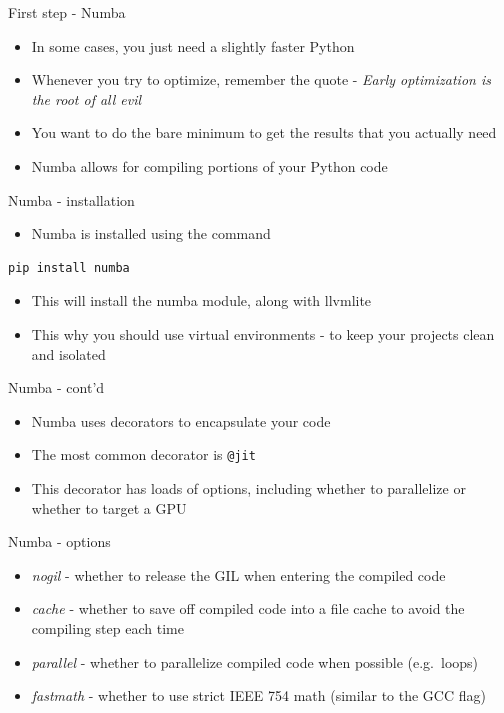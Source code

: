 \documentclass[presentation]{beamer}
\begin{document}
\begin{frame}[label=first-step---numba]{First step - Numba}
\begin{itemize}
\item In some cases, you just need a slightly faster Python
\item Whenever you try to optimize, remember the quote - \alert{\emph{Early
optimization is the root of all evil}}
\item You want to do the bare minimum to get the results that you actually
need
\item Numba allows for compiling portions of your Python code
\end{itemize}
\end{frame}
\begin{frame}[label=numba---installation,fragile]{Numba - installation}
 \begin{itemize}
\item Numba is installed using the command
\end{itemize}

\begin{verbatim}
pip install numba
\end{verbatim}

\begin{itemize}
\item This will install the numba module, along with llvmlite
\item This why you should use virtual environments - to keep your projects
clean and isolated
\end{itemize}
\end{frame}
\begin{frame}[label=numba---contd,fragile]{Numba - cont'd}
 \begin{itemize}
\item Numba uses decorators to encapsulate your code
\item The most common decorator is \texttt{@jit}
\item This decorator has loads of options, including whether to parallelize
or whether to target a GPU
\end{itemize}
\end{frame}
\begin{frame}[label=numba---options]{Numba - options}
\begin{itemize}
\item \alert{\emph{nogil}} - whether to release the GIL when entering the compiled code
\item \alert{\emph{cache}} - whether to save off compiled code into a file cache to
avoid the compiling step each time
\item \alert{\emph{parallel}} - whether to parallelize compiled code when possible
(e.g. loops)
\item \alert{\emph{fastmath}} - whether to use strict IEEE 754 math (similar to the GCC
flag)
\end{itemize}
\end{frame}
\end{document}
